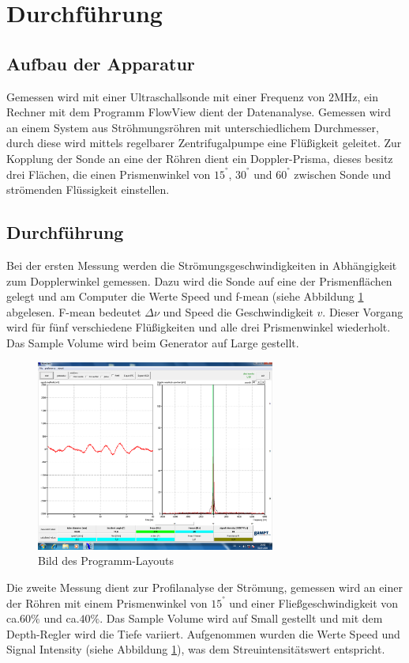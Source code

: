 \section{Durchführung}
\label{sec:Durchführung}
\subsection{Aufbau der Apparatur}
Gemessen wird mit einer Ultraschallsonde mit einer Frequenz von $2\si{\mega\hertz}$, ein
Rechner mit dem Programm FlowView dient der Datenanalyse. Gemessen wird an einem System aus Ströhmungsröhren mit unterschiedlichem
Durchmesser, durch diese wird mittels regelbarer Zentrifugalpumpe eine Flüßigkeit geleitet. Zur Kopplung der Sonde an eine der Röhren dient ein Doppler-Prisma,
dieses besitz drei Flächen, die einen Prismenwinkel von $15^°$, $30^°$ und $60^°$ zwischen Sonde und strömenden Flüssigkeit einstellen.

\subsection{Durchführung}
\label{sec:durch}
Bei der ersten Messung werden die Strömungsgeschwindigkeiten in Abhängigkeit zum Dopplerwinkel gemessen. Dazu wird die Sonde auf eine der Prismenflächen gelegt und am Computer die Werte Speed und
f-mean (siehe Abbildung \ref{fig:bsp} abgelesen. F-mean bedeutet $\Delta\nu$ und Speed die Geschwindigkeit $v$.
Dieser Vorgang wird für fünf verschiedene Flüßigkeiten und alle drei Prismenwinkel wiederholt. Das Sample Volume wird beim Generator auf Large gestellt.
\begin{figure}
  \includegraphics[width=0.7\textwidth]{Unbenannt.png}
  \centering
   \caption{Bild des Programm-Layouts }
  \label{fig:bsp}
\end{figure}

Die zweite Messung dient zur Profilanalyse der Strömung,
gemessen wird an einer der Röhren mit einem Prismenwinkel von $15^°$ und einer
Fließgeschwindigkeit von ca.$60\%$ und ca.$40\%$.
Das Sample Volume wird auf Small gestellt und mit dem Depth-Regler wird die Tiefe variiert.
Aufgenommen wurden die Werte Speed und Signal Intensity (siehe Abbildung \ref{fig:bsp}), was dem Streuintensitätswert entspricht.
